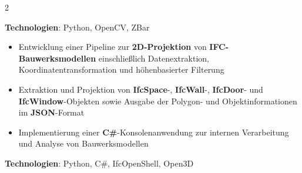 \documentclass[10pt,a4paper,withhyper]{altacv}
\begin{document}
\begin{paracol}{2}
  \vspace{0.5em}

  \textbf{Technologien}: Python, OpenCV, ZBar

  \vspace{0.5em}


  \vspace{0.5em}

  \begin{itemize}
    \item Entwicklung einer Pipeline zur \textbf{2D-Projektion} von \textbf{IFC-Bauwerksmodellen} einschließlich Datenextraktion, Koordinatentransformation und höhenbasierter Filterung
    \item Extraktion und Projektion von \textbf{IfcSpace}-, \textbf{IfcWall}-, \textbf{IfcDoor}- und \textbf{IfcWindow}-Objekten sowie Ausgabe der Polygon- und Objektinformationen im \textbf{JSON}-Format
    \item Implementierung einer \textbf{C\#}-Konsolenanwendung zur internen Verarbeitung und Analyse von Bauwerksmodellen
  \end{itemize}

  \vspace{0.5em}

  \textbf{Technologien}: Python, C\#, IfcOpenShell, Open3D

  \vspace{0.5em}


  \vspace{0.5em}


\end{paracol}
\end{document}

